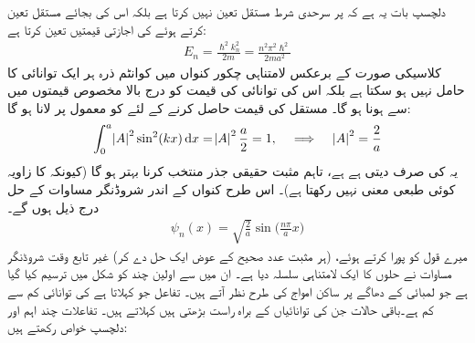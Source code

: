 دلچسپ بات یہ ہے کہ  پر سرحدی شرط مستقل    تعین نہیں کرتا ہے بلکہ اس کی بجائے مستقل تعین کرتے ہوئے     کی اجازتی قیمتیں تعین کرتا ہے:
\begin{align}\label{مساوات_شروڈنگر_لامتناہی_چکور_کنواں_توانائیاں}
E_{n}=\frac{\hslash^2 k^{2}_{n}}{2m}=\frac{n^{2}\pi^{2}\hslash^{2}}{2ma^{2}}
\end{align} 
کلاسیکی صورت کے برعکس لامتناہی چکور کنواں میں کوانٹم ذرہ ہر ایک توانائی کا حامل نہیں ہو سکتا ہے بلکہ اس کی توانائی کی قیمت کو درج بالا مخصوص  قیمتوں  میں سے ہونا ہو گا۔ مستقل   کی قیمت حاصل کرنے کے لئے  کو معمول پر لانا ہو گا: 
\begin{align*}
\int_{0}^{a}\abs{A}^{2}\sin^{2}(kx)\dif{x}=\abs{A}^{2}\frac{a}{2}=1,\quad \implies\quad \abs{A}^{2}=\frac{2}{a}
\end{align*} 
یہ   کی صرف  دیتی ہے ہے، تاہم مثبت حقیقی جذر   منتخب کرنا بہتر ہو گا (کیونکہ   کا زاویہ کوئی طبعی معنی نہیں رکھتا ہے)۔  اس طرح کنواں کے اندر شروڈنگر مساوات کے حل درج ذیل ہوں گے۔
\begin{align}
\psi_{n}(x)=\sqrt{\frac{2}{a}}\sin\big(\frac{n\pi}{a}x\big)
\end{align}
میرے قول کو پورا کرتے ہوئے، (ہر مثبت عدد صحیح  کے عوض  ایک حل دے کر)  غیر تابع وقت شروڈنگر مساوات نے حلوں کا ایک لامتناہی سلسلہ دیا ہے۔  ان میں سے اولین چند کو  شکل میں ترسیم کیا گیا ہے جو لمبائی  کے دھاگے پر ساکن امواج کی طرح نظر آتے ہیں۔ تفاعل  جو  کہلاتا ہے     کی توانائی کم سے کم ہے۔باقی حالات جن کی توانائیاں     کے براہ راست بڑھتی ہیں   کہلاتے ہیں۔ تفاعلات    چند اہم اور دلچسپ خواص رکھتے ہیں:

